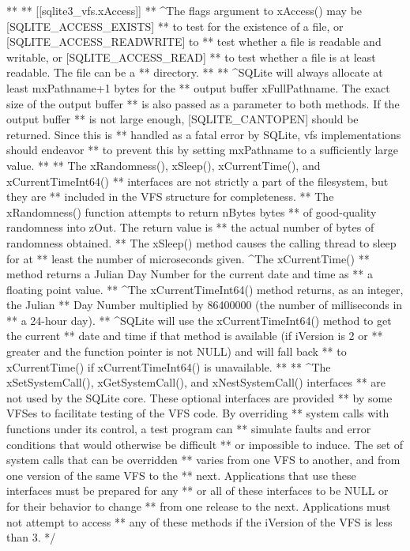 \begin{Codex}[label=sqlite3.h,numbers=left]
{**
** [[sqlite3_vfs.xAccess]]
** ^The flags argument to xAccess() may be [SQLITE_ACCESS_EXISTS]
** to test for the existence of a file, or [SQLITE_ACCESS_READWRITE] to
** test whether a file is readable and writable, or [SQLITE_ACCESS_READ]
** to test whether a file is at least readable.   The file can be a
** directory.
**
** ^SQLite will always allocate at least mxPathname+1 bytes for the
** output buffer xFullPathname.  The exact size of the output buffer
** is also passed as a parameter to both  methods. If the output buffer
** is not large enough, [SQLITE_CANTOPEN] should be returned. Since this is
** handled as a fatal error by SQLite, vfs implementations should endeavor
** to prevent this by setting mxPathname to a sufficiently large value.
**
** The xRandomness(), xSleep(), xCurrentTime(), and xCurrentTimeInt64()
** interfaces are not strictly a part of the filesystem, but they are
** included in the VFS structure for completeness.
** The xRandomness() function attempts to return nBytes bytes
** of good-quality randomness into zOut.  The return value is
** the actual number of bytes of randomness obtained.
** The xSleep() method causes the calling thread to sleep for at
** least the number of microseconds given.  ^The xCurrentTime()
** method returns a Julian Day Number for the current date and time as
** a floating point value.
** ^The xCurrentTimeInt64() method returns, as an integer, the Julian
** Day Number multiplied by 86400000 (the number of milliseconds in 
** a 24-hour day).  
** ^SQLite will use the xCurrentTimeInt64() method to get the current
** date and time if that method is available (if iVersion is 2 or 
** greater and the function pointer is not NULL) and will fall back
** to xCurrentTime() if xCurrentTimeInt64() is unavailable.
**
** ^The xSetSystemCall(), xGetSystemCall(), and xNestSystemCall() interfaces
** are not used by the SQLite core.  These optional interfaces are provided
** by some VFSes to facilitate testing of the VFS code. By overriding 
** system calls with functions under its control, a test program can
** simulate faults and error conditions that would otherwise be difficult
** or impossible to induce.  The set of system calls that can be overridden
** varies from one VFS to another, and from one version of the same VFS to the
** next.  Applications that use these interfaces must be prepared for any
** or all of these interfaces to be NULL or for their behavior to change
** from one release to the next.  Applications must not attempt to access
** any of these methods if the iVersion of the VFS is less than 3.
*/
}
\end{Codex}
